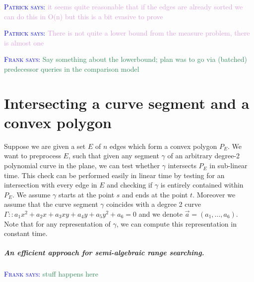 \documentclass[UKenglish]{lipics-v2019}
\newcommand{\myremark}[4]{\textcolor{blue}{\textsc{#1 #2:}} \textcolor{#4}{\textsf{#3}}}
\newcommand{\frank}[2][says]{\myremark{Frank}{#1}{#2}{SeaGreen}}
\newcommand{\patrick}[2][says]{\myremark{Patrick}{#1}{#2}{Plum}}
\begin{document}
\patrick{it seems quite reasonable that if the edges are already sorted we can do this in O(n) but this is a bit evasive to prove}

\patrick{There is not quite a lower bound from the measure problem, there is almost one}

\frank{Say something about the lowerbound; plan was to go via
  (batched) predecessor queries in the comparison model}


\section{Intersecting a curve segment and a convex polygon}
\label{sec:intersectionsearch}
Suppose we are given a set $E$ of $n$ edges which form a convex polygon $P_E$. We want to preprocess $E$, such that given any segment $\gamma$ of an arbitrary degree-2 polynomial curve in the plane, we can test whether $\gamma$ intersects $P_E$ in sub-linear time. This check can be performed easily in linear time by testing for an intersection with every edge in $E$ and checking if $\gamma$ is entirely contained within $P_E$. We assume $\gamma$ starts at the point $s$ and ends at the point $t$. Moreover we assume that the curve segment $\gamma$ coincides with a degree 2 curve $\Gamma :: a_1 x^2 + a_2 x + a_3 xy + a_4 y + a_5 y^2 + a_6 = 0$ and we denote $\vec{a} = (a_1, \ldots, a_6)$. Note that for any representation of $\gamma$, we can compute this representation in constant time.

\subparagraph*{An efficient approach for semi-algebraic range searching.}

\frank{stuff happens here}
\end{document}
